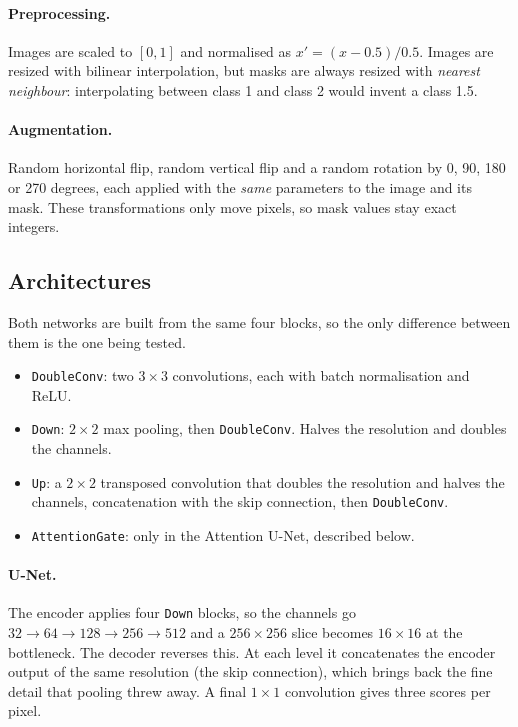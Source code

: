 \documentclass[11pt,a4paper]{article}
\newcommand{\code}[1]{\texttt{#1}}
\begin{document}
\paragraph{Preprocessing.} Images are scaled to $[0,1]$ and normalised as
$x' = (x - 0.5)/0.5$. Images are resized with bilinear interpolation, but masks
are always resized with \emph{nearest neighbour}: interpolating between class 1
and class 2 would invent a class 1.5.

\paragraph{Augmentation.} Random horizontal flip, random vertical flip and a
random rotation by 0, 90, 180 or 270 degrees, each applied with the \emph{same}
parameters to the image and its mask. These transformations only move pixels, so
mask values stay exact integers.

\subsection{Architectures}

Both networks are built from the same four blocks, so the only difference between
them is the one being tested.

\begin{itemize}
  \item \code{DoubleConv}: two $3\times3$ convolutions, each with batch
        normalisation and ReLU.
  \item \code{Down}: $2\times2$ max pooling, then \code{DoubleConv}. Halves the
        resolution and doubles the channels.
  \item \code{Up}: a $2\times2$ transposed convolution that doubles the resolution
        and halves the channels, concatenation with the skip connection, then
        \code{DoubleConv}.
  \item \code{AttentionGate}: only in the Attention U-Net, described below.
\end{itemize}

\paragraph{U-Net.} The encoder applies four \code{Down} blocks, so the channels go
$32 \to 64 \to 128 \to 256 \to 512$ and a $256\times256$ slice becomes
$16\times16$ at the bottleneck. The decoder reverses this. At each level it
concatenates the encoder output of the same resolution (the skip connection),
which brings back the fine detail that pooling threw away. A final $1\times1$
convolution gives three scores per pixel.
\end{document}
